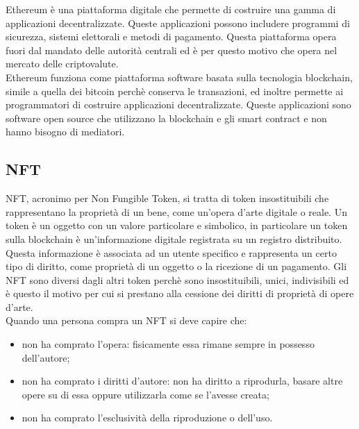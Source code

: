 Ethereum è una piattaforma digitale che permette di costruire una gamma di applicazioni decentralizzate. Queste applicazioni possono includere programmi di sicurezza, sistemi elettorali e metodi di pagamento. Questa piattaforma opera fuori dal mandato delle autorità centrali ed è per questo motivo che opera nel mercato delle criptovalute.\\
Ethereum funziona come piattaforma software basata sulla tecnologia blockchain, simile a quella dei bitcoin perchè conserva le transazioni, ed inoltre permette ai programmatori di costruire applicazioni decentralizzate. Queste applicazioni sono software open source che utilizzano la blockchain e gli smart contract e non hanno bisogno di mediatori. 

\subsection{NFT}

\gls{NFT}, acronimo per Non Fungible Token, si tratta di token insostituibili che rappresentano la proprietà di un bene, come un'opera d'arte digitale o reale. Un token è un oggetto con un valore particolare e simbolico, in particolare un token sulla blockchain è un'informazione digitale registrata su un registro distribuito. Questa informazione è associata ad un utente specifico e rappresenta un certo tipo di diritto, come proprietà di un oggetto o la ricezione di un pagamento. Gli \gls{NFT} sono diversi dagli altri token perchè sono insostituibili, unici, indivisibili ed è questo il motivo per cui si prestano alla cessione dei diritti di proprietà di opere d'arte.\\
Quando una persona compra un \gls{NFT} si deve capire che:
\begin{itemize}
	\item non ha comprato l'opera: fisicamente essa rimane sempre in possesso dell'autore;
	\item non ha comprato i diritti d'autore: non ha diritto a riprodurla, basare altre opere su di essa oppure utilizzarla come se l'avesse creata;
	\item non ha comprato l'esclusività della riproduzione o dell'uso.
\end{itemize}

